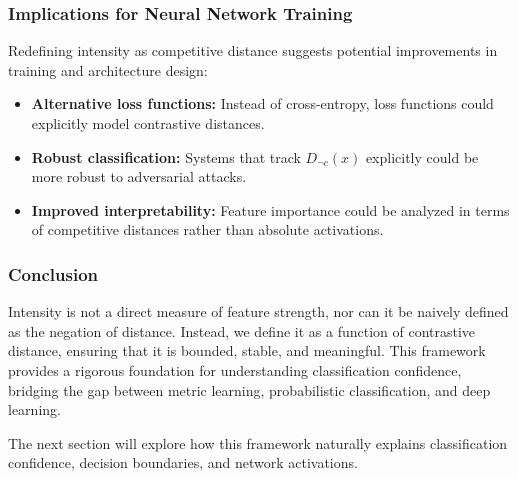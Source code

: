 \subsubsection{Implications for Neural Network Training}

Redefining intensity as competitive distance suggests potential improvements in training and architecture design:

\begin{itemize}
    \item \textbf{Alternative loss functions:} Instead of cross-entropy, loss functions could explicitly model contrastive distances.
    \item \textbf{Robust classification:} Systems that track \( D_{\neg c}(x) \) explicitly could be more robust to adversarial attacks.
    \item \textbf{Improved interpretability:} Feature importance could be analyzed in terms of competitive distances rather than absolute activations.
\end{itemize}

\subsubsection{Conclusion}

Intensity is not a direct measure of feature strength, nor can it be naively defined as the negation of distance. Instead, we define it as a function of contrastive distance, ensuring that it is bounded, stable, and meaningful. This framework provides a rigorous foundation for understanding classification confidence, bridging the gap between metric learning, probabilistic classification, and deep learning.

The next section will explore how this framework naturally explains classification confidence, decision boundaries, and network activations.
